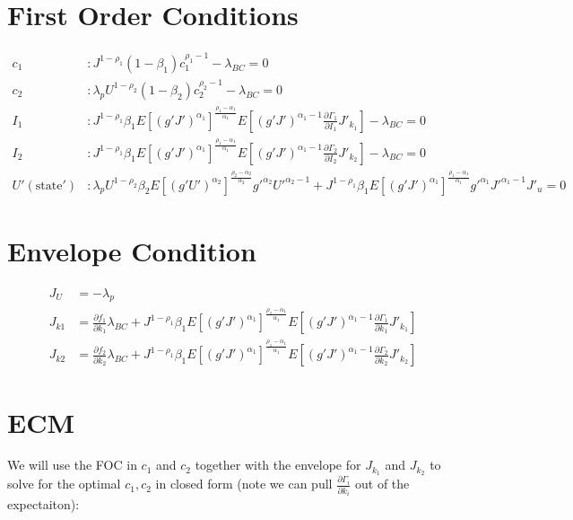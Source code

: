 \documentclass[10pt]{article}
\newcommand{\fracpd}[2]{
  \ensuremath{\frac{\partial #1}{\partial #2}}
}
\begin{document}
\section{First Order Conditions}

  \begin{align*}
    c_1 &: J^{1 - \rho_1} (1 - \beta_1) c_1^{\rho_1 - 1} - \lambda_{BC} = 0 \\
    c_2 &: \lambda_p U^{1 - \rho_2} (1 - \beta_2) c_2^{\rho_2 - 1} - \lambda_{BC} = 0 \\
    I_1 &: J^{1-\rho_1} \beta_1 E\left[(g'J')^{\alpha_1} \right]^{\frac{\rho_1 - \alpha_1}{\alpha_1}} E \left[ (g'J')^{\alpha_1 - 1} \fracpd{\Gamma_1}{I_1} J'_{k_1} \right] - \lambda_{BC} = 0 \\
    I_2 &: J^{1-\rho_1} \beta_1 E\left[(g'J')^{\alpha_1} \right]^{\frac{\rho_1 - \alpha_1}{\alpha_1}} E \left[ (g'J')^{\alpha_1 - 1} \fracpd{\Gamma_2}{I_2} J'_{k_2} \right] - \lambda_{BC} = 0 \\
    U'(\text{state}') &: \lambda_p U^{1 - \rho_2} \beta_2 E \left[ (g'U')^{\alpha_2} \right]^{\frac{\rho_2 - \alpha_2}{\alpha_2}} g'^{\alpha_2} U'^{\alpha_2 - 1} + J^{1 - \rho_1} \beta_1 E \left[ (g'J')^{\alpha_1} \right]^{\frac{\rho_1 - \alpha_1}{\alpha_1}} g'^{\alpha_1}J'^{\alpha_1 -1}J'_{u} = 0
  \end{align*}


\section{Envelope Condition}

\begin{align*}
  J_U &= - \lambda_p \\
  J_{k1} &= \fracpd{f_1}{k_1} \lambda_{BC} +  J^{1-\rho_1} \beta_1 E\left[(g'J')^{\alpha_1} \right]^{\frac{\rho_1 - \alpha_1}{\alpha_1}} E \left[ (g'J')^{\alpha_1 - 1} \fracpd{\Gamma_1}{k_1} J'_{k_1} \right] \\
  J_{k2} &= \fracpd{f_2}{k_2} \lambda_{BC} +  J^{1-\rho_1} \beta_1 E\left[(g'J')^{\alpha_1} \right]^{\frac{\rho_1 - \alpha_1}{\alpha_1}} E \left[ (g'J')^{\alpha_1 - 1} \fracpd{\Gamma_2}{k_2} J'_{k_2} \right]
\end{align*}

\section{ECM}

We will use the FOC in $c_1$ and $c_2$ together with the envelope for $J_{k_1}$
and $J_{k_2}$ to solve for the optimal $c_1,c_2$ in closed form (note we can pull $\fracpd{\Gamma_i}{k_i}$ out of the expectaiton):
\end{document}
